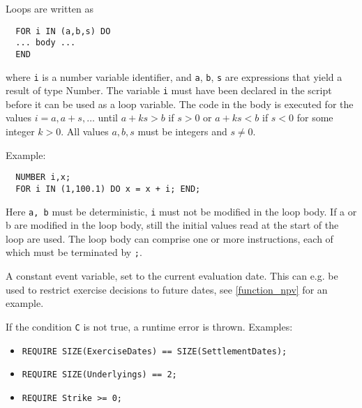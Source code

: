 
Loops are written as

\begin{verbatim}
  FOR i IN (a,b,s) DO
  ... body ...
  END
\end{verbatim}

where \verb+i+ is a number variable identifier, and \verb+a+, \verb+b+, \verb+s+ are expressions that yield a result of
type Number. The variable \verb+i+ must have been declared in the script before it can be used as a loop variable. The
code in the body is executed for the values $i=a, a+s, \ldots$ until $a+ks>b$ if $s>0$ or $a+ks<b$ if $s<0$ for some
integer $k>0$. All values $a,b,s$ must be integers and $s\neq 0$.

Example:

\begin{verbatim}
  NUMBER i,x;
  FOR i IN (1,100.1) DO x = x + i; END;
\end{verbatim}

Here {\tt a, b} must be deterministic, {\tt i} must not be modified in the loop body. If a or b are modified in the loop
body, still the initial values read at the start of the loop are used. The loop body can comprise one or more
instructions, each of which must be terminated by {\tt ;}.

\label{todayvar}

A constant event variable, set to the current evaluation date. This can e.g. be used to restrict exercise decisions to
future dates, see \ref{function_npv} for an example.


If the condition {\tt C} is not true, a runtime error is thrown. Examples:
 
\begin{itemize}
\item {\tt REQUIRE SIZE(ExerciseDates) == SIZE(SettlementDates);}
\item {\tt REQUIRE SIZE(Underlyings) == 2;}
\item {\tt REQUIRE Strike >= 0;}
\end{itemize}

